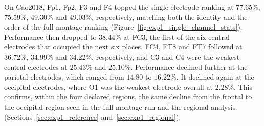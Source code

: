On Cao2018, Fp1, Fp2, F3 and F4 topped the single-electrode ranking at 77.65\%, 75.59\%, 49.30\% and 49.03\%, respectively, matching both the identity and the order of the full-montage ranking (Figure~\ref{fig:exp1_single_channel_stats}). Performance then dropped to $38.44\%$ at FC3, the first of the six central electrodes that occupied the next six places. FC4, FT8 and FT7 followed at 36.72\%, 34.99\% and 34.22\%, respectively, and C3 and C4 were the weakest central electrodes at $25.43\%$ and $25.10\%$. Performance declined further at the parietal electrodes, which ranged from $14.80$ to $16.22\%$. It declined again at the occipital electrodes, where O1 was the weakest electrode overall at $2.28\%$. This confirms, within the four declared regions, the same decline from the frontal to the occipital region seen in the full-montage run and the regional analysis (Sections~\ref{sec:exp1_reference} and~\ref{sec:exp1_regional}).
